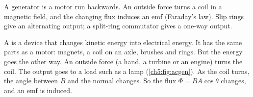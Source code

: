 \begin{bigidea}
A generator is a motor run backwards. An outside force turns a coil in a magnetic
field, and the changing flux induces an emf (Faraday's law). Slip rings give an
alternating output; a split-ring commutator gives a one-way output.
\end{bigidea}

\begin{keywords}
\end{keywords}

A  is a device that changes kinetic energy into electrical energy. It
has the same parts as a motor: magnets, a coil on an axle, brushes and rings. But the
energy goes the other way. An outside force (a hand, a turbine or an engine) turns the coil.
The output goes to a load such as a lamp (\cref{ch5:fig:acgen}). As the coil turns, the
angle between $B$ and the normal changes. So the flux $\Phi = BA\cos\theta$ changes, and
an emf is induced.

